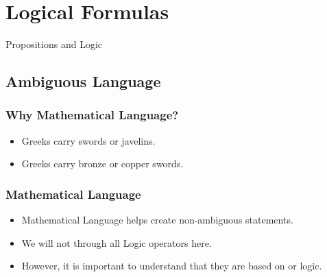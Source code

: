 \section{Logical Formulas}

\frame{\tableofcontents[currentsection,hideallsubsections, firstsection=2, sections={2-5}]}

\begin{frame}
  \begin{center}
    Propositions and Logic
  \end{center}
\end{frame}

\subsection{Ambiguous Language}
\begin{frame}
  \frametitle{Why Mathematical Language?}

  \begin{itemize}
  \item Greeks carry swords or javelins.

    \bigskip

  \item Greeks carry bronze or copper swords.
  \end{itemize}
\end{frame}

\begin{frame}
  \frametitle{Mathematical Language}
  \begin{itemize}
  \item Mathematical Language helps create non-ambiguous statements.
    \bigskip

  \item We will not through all Logic operators here.
    \bigskip

  \item However, it is important to understand that they are based on
     or  logic.
  \end{itemize}
\end{frame}


